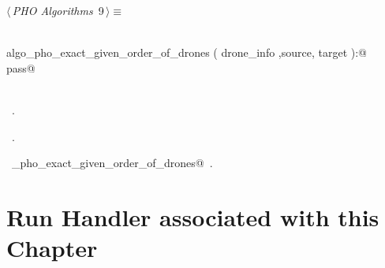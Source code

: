 \documentclass[12.0pt]{report}
\begin{document}
\begin{flushleft} \small
\begin{minipage}{\linewidth}\label{scrap5}\raggedright\small
{} $\langle\,${\itshape PHO Algorithms}\nobreak\ {\footnotesize {9}}$\,\rangle\equiv$
\vspace{-1ex}
\begin{list}{}{} \item
\mbox{}\verb@@\\
\mbox{}\verb@def  algo_pho_exact_given_order_of_drones ( drone_info ,source, target ):@\\
\mbox{}\verb@    pass@\\
\mbox{}\verb@@\\
\mbox{}\verb@@{\NWsep}
\end{list}
\vspace{-1.5ex}
\footnotesize
\begin{list}{}{\setlength{\itemsep}{-\parsep}\setlength{\itemindent}{-\leftmargin}}
\item \NWtxtMacroDefBy\ .
\item \NWtxtMacroRefIn\ .
\item \NWtxtIdentsDefed\nobreak\  \verb@algo_pho_exact_given_order_of_drones@\nobreak\ .
\item{}
\end{list}
\end{minipage}\vspace{4ex}
\end{flushleft}




\newpage
\section{Run Handler associated with this Chapter}
\end{document}
